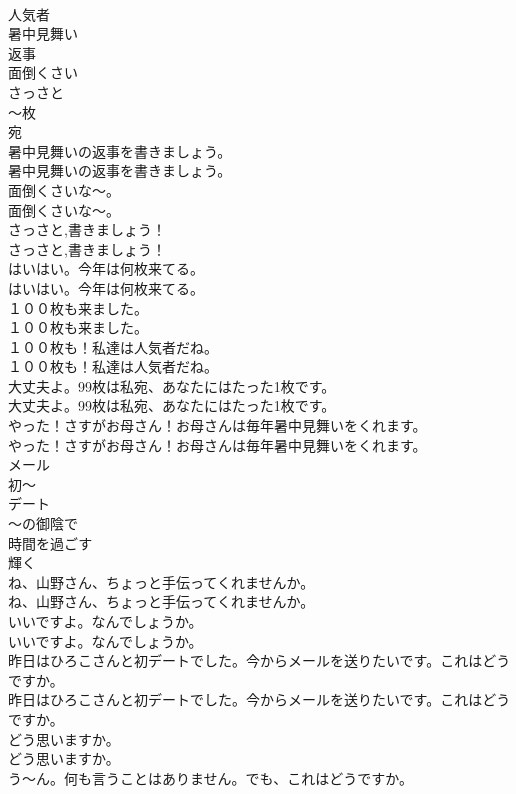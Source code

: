 \documentclass[8pt]{extreport}
\begin{document}
\begin{CJK}{UTF8}{min}
\\	人気者
\\	暑中見舞い
\\	返事
\\	面倒くさい
\\	さっさと
\\	～枚
\\	宛
\\	暑中見舞いの返事を書きましょう。	
\\	暑中見舞いの返事を書きましょう。 
\\	面倒くさいな〜。	
\\	面倒くさいな〜。 
\\	さっさと,書きましょう！	
\\	さっさと,書きましょう！ 
\\	はいはい。今年は何枚来てる。	
\\	はいはい。今年は何枚来てる。 
\\	１００枚も来ました。	
\\	１００枚も来ました。 
\\	１００枚も！私達は人気者だね。	
\\	１００枚も！私達は人気者だね。 
\\	大丈夫よ。99枚は私宛、あなたにはたった1枚です。	
\\	大丈夫よ。99枚は私宛、あなたにはたった1枚です。 
\\	やった！さすがお母さん！お母さんは毎年暑中見舞いをくれます。	
\\	やった！さすがお母さん！お母さんは毎年暑中見舞いをくれます。 
\\	メール
\\	初～
\\	デート
\\	～の御陰で
\\	時間を過ごす
\\	輝く
\\	ね、山野さん、ちょっと手伝ってくれませんか。	
\\	ね、山野さん、ちょっと手伝ってくれませんか。 
\\	いいですよ。なんでしょうか。	
\\	いいですよ。なんでしょうか。 
\\	昨日はひろこさんと初デートでした。今からメールを送りたいです。これはどうですか。	
\\	昨日はひろこさんと初デートでした。今からメールを送りたいです。これはどうですか。 
\\	どう思いますか。	
\\	どう思いますか。 
\\	う〜ん。何も言うことはありません。でも、これはどうですか。	

\end{CJK}
\end{document}
